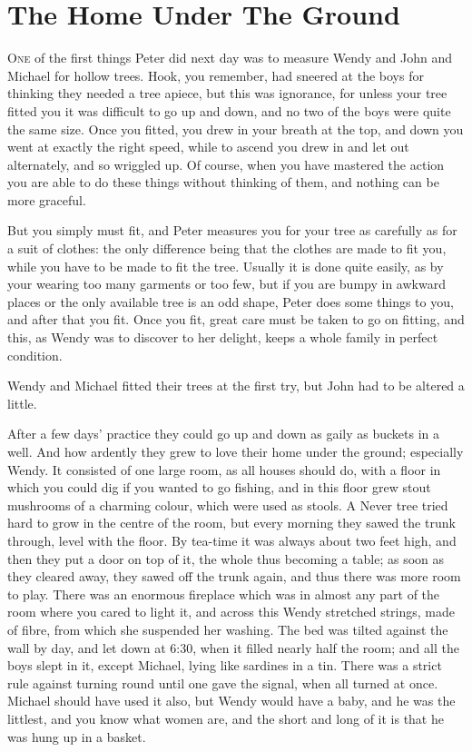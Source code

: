 \chapter{The Home Under The Ground}

\lettrine{O}{ne} of the first things Peter did next day was to measure Wendy and
John and Michael for hollow trees. Hook, you remember, had sneered at
the boys for thinking they needed a tree apiece, but this was
ignorance, for unless your tree fitted you it was difficult to go up
and down, and no two of the boys were quite the same size. Once you
fitted, you drew in your breath at the top, and down you went at
exactly the right speed, while to ascend you drew in and let out
alternately, and so wriggled up. Of course, when you have mastered the
action you are able to do these things without thinking of them, and
nothing can be more graceful.

But you simply must fit, and Peter measures you for your tree as
carefully as for a suit of clothes: the only difference being that the
clothes are made to fit you, while you have to be made to fit the tree.
Usually it is done quite easily, as by your wearing too many garments
or too few, but if you are bumpy in awkward places or the only
available tree is an odd shape, Peter does some things to you, and
after that you fit. Once you fit, great care must be taken to go on
fitting, and this, as Wendy was to discover to her delight, keeps a
whole family in perfect condition.

Wendy and Michael fitted their trees at the first try, but John had to
be altered a little.

After a few days' practice they could go up and down as gaily as
buckets in a well. And how ardently they grew to love their home under
the ground; especially Wendy. It consisted of one large room, as all
houses should do, with a floor in which you could dig if you wanted to
go fishing, and in this floor grew stout mushrooms of a charming
colour, which were used as stools. A Never tree tried hard to grow in
the centre of the room, but every morning they sawed the trunk through,
level with the floor. By tea-time it was always about two feet high,
and then they put a door on top of it, the whole thus becoming a table;
as soon as they cleared away, they sawed off the trunk again, and thus
there was more room to play. There was an enormous fireplace which was
in almost any part of the room where you cared to light it, and across
this Wendy stretched strings, made of fibre, from which she suspended
her washing. The bed was tilted against the wall by day, and let down
at 6:30, when it filled nearly half the room; and all the boys slept in
it, except Michael, lying like sardines in a tin. There was a strict
rule against turning round until one gave the signal, when all turned
at once. Michael should have used it also, but Wendy would have a baby,
and he was the littlest, and you know what women are, and the short and
long of it is that he was hung up in a basket.

